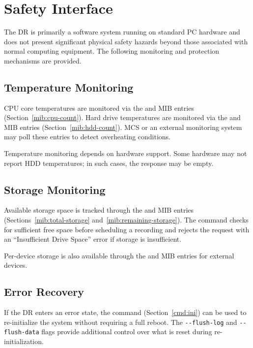 
\chapter{Safety Interface}
\label{sec:safety}

The DR is primarily a software system running on standard PC hardware and does
not present significant physical safety hazards beyond those associated with
normal computing equipment.  The following monitoring and protection mechanisms
are provided.

\section{Temperature Monitoring}

CPU core temperatures are monitored via the  and
 MIB entries (Section~\ref{mib:cpu-count}).  Hard drive
temperatures are monitored via the  and  MIB
entries (Section~\ref{mib:hdd-count}).  MCS or an external monitoring system
may poll these entries to detect overheating conditions.

Temperature monitoring depends on hardware support.  Some hardware may not
report HDD temperatures; in such cases, the  response may be
empty.

\section{Storage Monitoring}

Available storage space is tracked through the  and
 MIB entries (Sections~\ref{mib:total-storage}
and~\ref{mib:remaining-storage}).  The  command checks for
sufficient free space before scheduling a recording and rejects the request
with an ``Insufficient Drive Space'' error if storage is insufficient.

Per-device storage is also available through the  and
 MIB entries for external devices.

\section{Error Recovery}

If the DR enters an error state, the  command
(Section~\ref{cmd:ini}) can be used to re-initialize the system without
requiring a full reboot.  The \texttt{-{}-flush-log} and
\texttt{-{}-flush-data} flags provide additional control over what is reset
during re-initialization.

